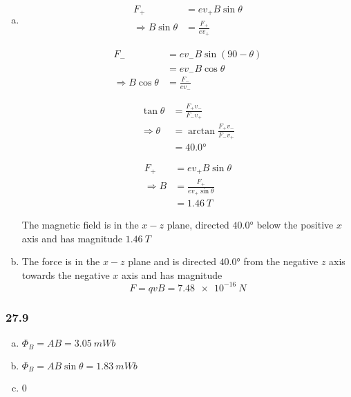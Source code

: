 \documentclass{article}
\begin{document}
\begin{enumerate}[(a)]
  \item

        \begin{align*}
          F_+                       & = e v_+ B \sin \theta \\
          \Rightarrow B \sin \theta & = \frac{F_+}{e v_+}
        \end{align*}

        \begin{align*}
          F_-                       & = e v_- B \sin (90 - \theta) \\
                                    & = e v_- B \cos \theta        \\
          \Rightarrow B \cos \theta & = \frac{F_-}{e v_-}
        \end{align*}

        \begin{align*}
          \tan \theta        & = \frac{F_+ v_-}{F_- v_+}         \\
          \Rightarrow \theta & = \arctan \frac{F_+ v_-}{F_- v_+} \\
                             & = \ang{40.0}
        \end{align*}

        \begin{align*}
          F_+           & = e v_+ B \sin \theta           \\
          \Rightarrow B & = \frac{F_+}{e v_+ \sin \theta} \\
                        & = \qty{1.46}{T}
        \end{align*}

        The magnetic field is in the $x-z$ plane, directed $\ang{40.0}$ below the positive $x$ axis and has magnitude $\qty{1.46}{T}$

  \item The force is in the $x-z$ plane and is directed $\ang{40.0}$ from the negative $z$ axis towards the negative $x$ axis and has magnitude \[F = q v B = \qty{7.48e-16}{N}\]
\end{enumerate}

\subsubsection{27.9}

\begin{enumerate}[(a)]
  \item $\Phi_B = A B = \qty{3.05}{mWb}$

  \item $\Phi_B = A B \sin \theta = \qty{1.83}{mWb}$

  \item $0$
\end{enumerate}
\end{document}
